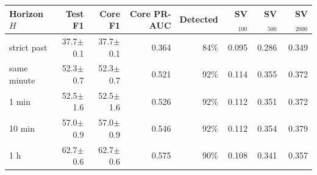 \begin{tabular}{lrrrrrrr}
\toprule
Horizon $H$ & Test F1 & Core F1 & Core PR-AUC & Detected & SV$_{100}$ & SV$_{500}$ & SV$_{2000}$ \\
\midrule
strict past & 37.7$\pm$0.1 & 37.7$\pm$0.1 & 0.364 & 84\% & 0.095 & 0.286 & 0.349 \\
same minute & 52.3$\pm$0.7 & 52.3$\pm$0.7 & 0.521 & 92\% & 0.114 & 0.355 & 0.372 \\
1 min & 52.5$\pm$1.6 & 52.5$\pm$1.6 & 0.526 & 92\% & 0.112 & 0.351 & 0.372 \\
10 min & 57.0$\pm$0.9 & 57.0$\pm$0.9 & 0.546 & 92\% & 0.112 & 0.354 & 0.379 \\
1 h & 62.7$\pm$0.6 & 62.7$\pm$0.6 & 0.575 & 90\% & 0.108 & 0.341 & 0.357 \\
\bottomrule
\end{tabular}